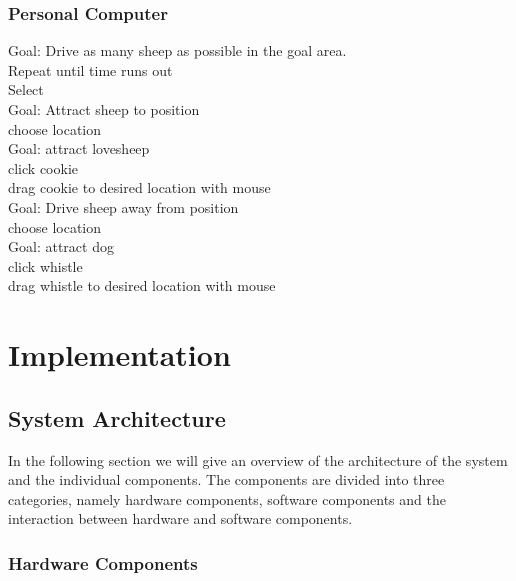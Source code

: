 \documentclass[a4paper,10pt]{report}
\newcommand{\tab}{\hspace*{1em}}
\begin{document}
\subsection{Personal Computer}
Goal: Drive as many sheep as possible in the goal area.
\\
\tab Repeat until time runs out \\
\tab \tab Select \\
\tab  \tab \tab Goal: Attract sheep to position \\
\tab \tab \tab \tab choose location \\
\tab \tab \tab \tab Goal: attract lovesheep \\
\tab \tab \tab \tab \tab click cookie \\
\tab \tab \tab \tab \tab drag cookie to desired location with mouse\\
\tab \tab \tab Goal: Drive sheep away from position\\
\tab \tab \tab \tab choose location \\
\tab \tab \tab \tab Goal: attract dog \\
\tab \tab \tab \tab \tab click whistle \\
\tab \tab \tab \tab \tab drag whistle to desired location with mouse\\

\chapter{Implementation}
\label{chap:implementation}

	\section{System Architecture}
	\label{sec:system-architecture}
	In the following section we will give an overview of the architecture of the system and the individual components.
	The components are divided into three categories, namely hardware components, software components and the interaction between hardware and software components.

	\subsection{Hardware Components}
	\label{HardwareComponents}
\end{document}
